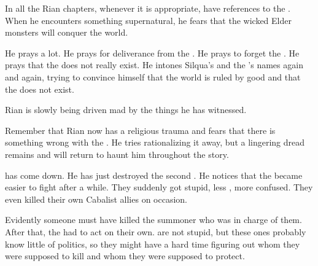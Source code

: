 In all the Rian chapters, whenever it is appropriate, have references to the . 
When he encounters something supernatural, he fears that the wicked Elder monsters will conquer the world. 

He prays a lot.
He prays for deliverance from the \bane. 
He prays to forget the \bane.
He prays that the \bane does not really exist. 
He intones Silqua's and the \sephiroth's names again and again, trying to convince himself that the world is ruled by good and that the \bane does not exist.  

Rian is slowly being driven mad by the things he has witnessed. 


Remember that Rian now has a religious trauma and fears that there is something wrong with the \sephiroth. 
He tries rationalizing it away, but a lingering dread remains and will return to haunt him throughout the story. 





\begin{comment}
  \section{Psyrex comes down}
\end{comment}
\new
\Psyrex has come down. 
He has just destroyed the second \bane. 
He notices that the \banes became easier to fight after a while. 
They suddenly got stupid, less \coordinated, more confused.
They even killed their own Cabalist allies on occasion. 

Evidently someone must have killed the summoner who was in charge of them.
After that, the \banes had to act on their own. 
\Banes are not stupid, but these ones probably know little of \Malcuric politics, so they might have a hard time figuring out whom they were supposed to kill and whom they were supposed to protect. 





